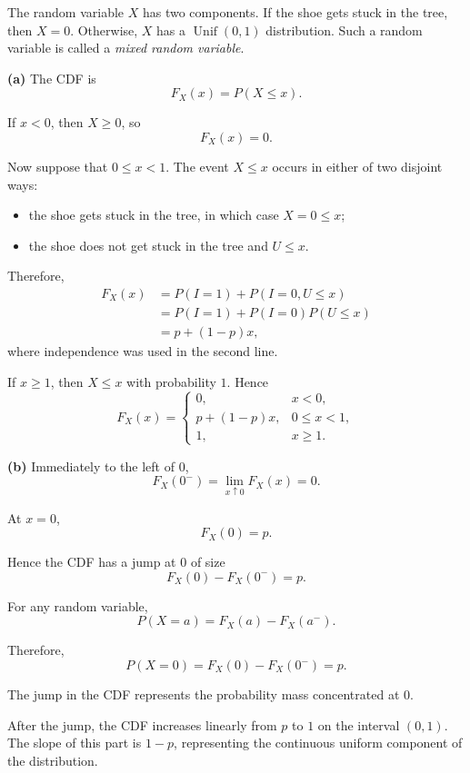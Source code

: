 \documentclass[11pt]{article}
\begin{document}
\begin{solutionbox}

The random variable \(X\) has two components. If the shoe gets stuck in the
tree, then \(X=0\). Otherwise, \(X\) has a
\(\operatorname{Unif}(0,1)\) distribution. Such a random variable is called a
\emph{mixed random variable}.

\textbf{(a)} The CDF is
\[
F_X(x)=P(X\leq x).
\]

If \(x<0\), then \(X\geq0\), so
\[
F_X(x)=0.
\]

Now suppose that \(0\leq x<1\). The event \(X\leq x\) occurs in either of two
disjoint ways:

\begin{itemize}[leftmargin=*]
    \item the shoe gets stuck in the tree, in which case \(X=0\leq x\);
    \item the shoe does not get stuck in the tree and \(U\leq x\).
\end{itemize}

Therefore,
\[
\begin{aligned}
F_X(x)
&=P(I=1)+P(I=0,U\leq x)\\
&=P(I=1)+P(I=0)P(U\leq x)\\
&=p+(1-p)x,
\end{aligned}
\]
where independence was used in the second line.

If \(x\geq1\), then \(X\leq x\) with probability \(1\). Hence
\[
\boxed{
F_X(x)=
\begin{cases}
0, & x<0,\\[1mm]
p+(1-p)x, & 0\leq x<1,\\[1mm]
1, & x\geq1.
\end{cases}}
\]

\textbf{(b)} Immediately to the left of \(0\),
\[
F_X(0^-)
=
\lim_{x\uparrow0}F_X(x)
=
0.
\]

At \(x=0\),
\[
F_X(0)=p.
\]

Hence the CDF has a jump at \(0\) of size
\[
F_X(0)-F_X(0^-)=p.
\]

For any random variable,
\[
P(X=a)=F_X(a)-F_X(a^-).
\]

Therefore,
\[
P(X=0)=F_X(0)-F_X(0^-)=p.
\]

The jump in the CDF represents the probability mass concentrated at \(0\).

After the jump, the CDF increases linearly from \(p\) to \(1\) on the interval
\((0,1)\). The slope of this part is \(1-p\), representing the continuous
uniform component of the distribution.


\end{solutionbox}
\end{document}
